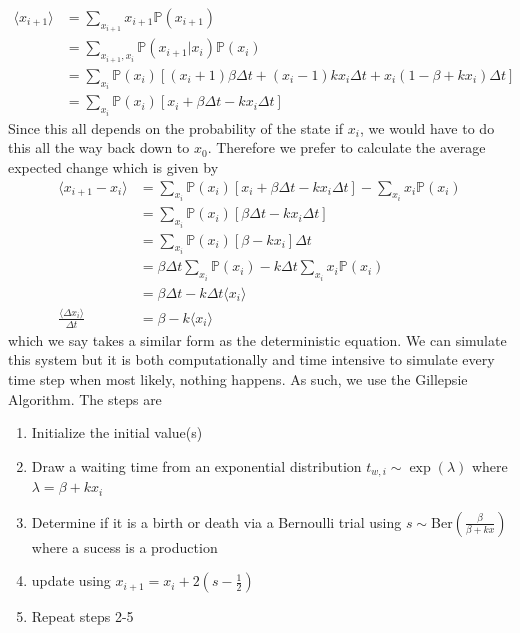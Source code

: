 \documentclass{article}
\newcommand{\p}{\mathbb{P}}
\theoremstyle{definition}
\begin{document}
\begin{equation*}
    \begin{split}
        \langle x_{i+1} \rangle &= \sum_{x_{i+1}} x_{i+1} \p (x_{i+1}) \\
        &= \sum_{x_{i+1},x_i} \p(x_{i+1}|x_i)\p(x_i) \\
        &= \sum_{x_i} \p (x_i) [(x_i+1)\beta \Delta t + (x_i-1)kx_i\Delta t + x_i(1-\beta+kx_i)\Delta t] \\
        &= \sum_{x_i} \p(x_i)[x_i + \beta \Delta t-kx_i \Delta t]
    \end{split}
\end{equation*}
Since this all depends on the probability of the state if $x_i$, we would have to do this all the way back down to $x_0$. Therefore we prefer to calculate the average expected change which is given by 
\begin{equation*}
    \begin{split}
        \langle x_{i+1}-x_i\rangle &= \sum_{x_i} \p(x_i)[x_i+\beta\Delta t-kx_i \Delta t] - \sum_{x_i}x_i\p(x_i) \\ &= \sum_{x_i}\p(x_i) [\beta \Delta t-kx_i\Delta t] \\
        &= \sum_{x_i}\p(x_i)[\beta-kx_i]\Delta t\\
        &= \beta \Delta t\sum_{x_i} \p(x_i) - k\Delta t\sum_{x_i}x_i\p(x_i) \\
        &= \beta \Delta t - k\Delta t \langle x_i \rangle \\
        \frac{\langle \Delta x_i \rangle}{\Delta t}&= \beta - k \langle x_i \rangle
    \end{split}
\end{equation*}
which we say takes a similar form as the deterministic equation. We can simulate this system but it is both computationally and time intensive to simulate every time step when most likely, nothing happens. As such, we use the Gillepsie Algorithm. The steps are 
\begin{enumerate}
    \item Initialize the initial value(s)
    \item Draw a waiting time from an exponential distribution $t_{w,i} \sim \exp(\lambda)$ where $\lambda = \beta+kx_i$ 
    \item Determine if it is a birth or death via a Bernoulli trial using $s \sim $Ber$\left( \frac{\beta}{\beta+kx} \right)$ where a sucess is a production 
    \item update using $x_{i+1} = x_i +2 \left(s-\frac{1}{2}\right)$
    \item Repeat steps 2-5
\end{enumerate}
\end{document}
